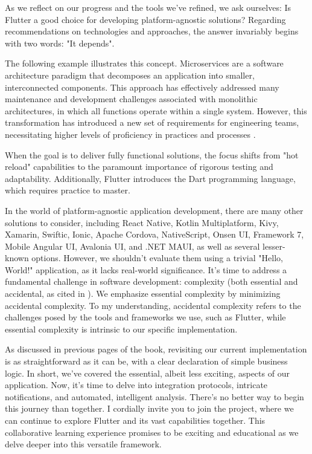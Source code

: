 
As we reflect on our progress and the tools we've refined, we ask ourselves: Is Flutter a good choice for developing 
platform-agnostic solutions? Regarding recommendations on technologies and approaches, the answer invariably begins with 
two words: "It depends".

The following example illustrates this concept. Microservices are a software architecture paradigm that decomposes an 
application into smaller, interconnected components. This approach has effectively addressed many maintenance and 
development challenges associated with monolithic architectures, in which all functions operate within a single system. 
However, this transformation has introduced a new set of requirements for engineering teams, necessitating higher levels 
of proficiency in practices \cite{John22} and processes \cite{Mugr23}.

When the goal is to deliver fully functional solutions, the focus shifts from "hot reload" capabilities to the paramount 
importance of rigorous testing and adaptability. Additionally, Flutter introduces the Dart programming language, which 
requires practice to master.

In the world of platform-agnostic application development, there are many other solutions to consider, including React 
Native, Kotlin Multiplatform, Kivy, Xamarin, Swiftic, Ionic, Apache Cordova, NativeScript, Onsen UI, Framework 7, Mobile 
Angular UI, Avalonia UI, and .NET MAUI, as well as several lesser-known options. However, we shouldn't evaluate them 
using a trivial "Hello, World!" application, as it lacks real-world significance. It's time to address a fundamental 
challenge in software development: complexity (both essential and accidental, as cited in \cite{Broo87}). We emphasize 
essential complexity by minimizing accidental complexity. To my understanding, accidental complexity refers to the 
challenges posed by the tools and frameworks we use, such as Flutter, while essential complexity is intrinsic to our 
specific implementation.

As discussed in previous pages of the book, revisiting our current implementation is as straightforward as it can be, 
with a clear declaration of simple business logic. In short, we've covered the essential, albeit less exciting, aspects 
of our application. Now, it's time to delve into integration protocols, intricate notifications, and automated, 
intelligent analysis. There's no better way to begin this journey than together. I cordially invite you to join the 
project, where we can continue to explore Flutter and its vast capabilities together. This collaborative learning 
experience promises to be exciting and educational as we delve deeper into this versatile framework.
